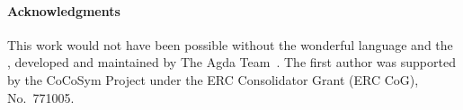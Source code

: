 \paragraph*{Acknowledgments}
This work would not have been possible without the wonderful \agda language and
the \agdastdlib, developed and maintained by The Agda Team~\cite{agdastdlib}.
The first author was supported by the CoCoSym Project under the ERC
Consolidator Grant (ERC CoG), No.~771005.




